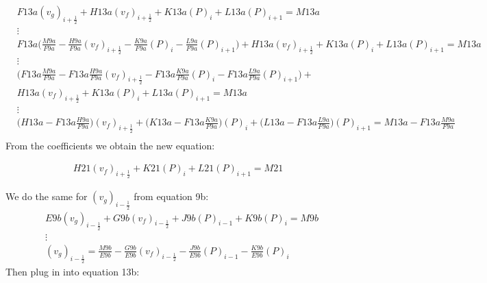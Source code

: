 \documentclass[11pt,letterpaper,titlepage]{article}
\newcommand{\half}{\frac{1}{2}}
\begin{document}
\begin{equation*}
\begin{aligned}
&F13a (v_g)_{i+\half} + H13a (v_f)_{i+\half} + K13a (P)_{i} + L13a (P)_{i+1}=M13a\\ 
&\vdots\\
&F13a \biggr(  \frac{M9a}{F9a} - \frac{H9a}{F9a}  (v_f)_{i+\half} - \frac{K9a}{F9a}  (P)_{i} - \frac{L9a}{F9a}  (P)_{i+1}  \biggr) + H13a (v_f)_{i+\half} + K13a (P)_{i} + L13a (P)_{i+1}=M13a\\
&\vdots\\
&\biggr(  F13a\frac{M9a}{F9a} - F13a\frac{H9a}{F9a}  (v_f)_{i+\half} - F13a\frac{K9a}{F9a}  (P)_{i} - F13a\frac{L9a}{F9a}  (P)_{i+1}  \biggr) +\\
&H13a (v_f)_{i+\half} + K13a (P)_{i} + L13a (P)_{i+1}=M13a\\
&\vdots\\
&\biggr( H13a - F13a\frac{H9a}{F9a} \biggr)(v_f)_{i+\half} + \biggr( K13a - F13a\frac{K9a}{F9a} \biggr)(P)_{i} + \biggr( L13a - F13a\frac{L9a}{F9a} \biggr)(P)_{i+1}=M13a-F13a\frac{M9a}{F9a}\\
\end{aligned}
\end{equation*}
\newline
\newline
\noindent
From the coefficients we obtain the new equation:

\begin{equation}
\begin{aligned}
H21(v_f)_{i+\half} + K21(P)_{i} + L21(P)_{i+1}=M21
\end{aligned}
\end{equation}
           
           
           
           
           
\newpage
\noindent We do the same for $(v_g)_{i-\half}$ from equation 9b:
\begin{equation*}
\begin{aligned}
&E9b  (v_g)_{i-\half} + G9b  (v_f)_{i-\half} + J9b  (P)_{i-1} + K9b  (P)_{i} =M9b \\
&\vdots\\
&(v_g)_{i-\half}= \frac{M9b}{E9b} - \frac{G9b}{E9b}  (v_f)_{i-\half} - \frac{J9b}{E9b}  (P)_{i-1} - \frac{K9b}{E9b}  (P)_{i}
\end{aligned}
\end{equation*}
\newline
\noindent
Then plug in into equation 13b:
\end{document}
